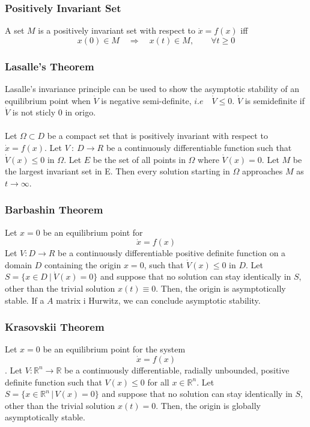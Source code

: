 \documentclass{article}
\begin{document}
\subsubsection{Positively Invariant Set}
A set $M$ is a positively invariant set with respect to $\dot x = f(x)$ iff
\begin{equation*}
	x(0) \in M \quad \Rightarrow \quad x(t) \in M, \qquad \forall t \geq 0
\end{equation*}
\subsubsection{Lasalle's Theorem}
Lasalle's invariance principle can be used to show the asymptotic stability of
an equilibrium point when $\dot V$ is negative semi-definite, $i.e \quad \dot V
	\leq 0$. $\dot V$ is semidefinite if $\dot V$ is not sticly 0 in origo. \\\\
Let $\Omega \subset D$ be a compact set that is positively invariant with
respect to $\dot x = f(x)$. Let $V\::\:D \rightarrow R$ be a continuously
differentiable function such that $\dot V(x) \leq 0$ in $\Omega$. Let $E$ be
the set of all points in $\Omega$ where $\dot V(x) = 0$. Let $M$ be the largest
invariant set in E. Then every solution starting in $\Omega$ approaches $M$ as
$t \rightarrow \infty$.
\begin{figure}[h]
	\centering
	\def\svgwidth{0.5\columnwidth}
	
\end{figure}
\subsubsection{Barbashin Theorem}
Let $x=0$ be an equilibrium point for \[\dot{x} = f(x)\]
Let $V: D \rightarrow R$ be a continuously differentiable positive definite
function on a domain $D$ containing the origin $x=0$, such that $\dot V(x) \leq
0$ in $D$. Let $S=\{x \in D\:|\:\dot V(x) = 0\}$ and suppose that no solution
can stay identically in $S$, other than the trivial solution $x(t) \equiv 0$.
Then, the origin is asymptotically stable. If a $A$ matrix i Hurwitz, we can
conclude asymptotic stability.
\subsubsection{Krasovskii Theorem}
Let \(x = 0\) be an equilibrium point for the system\[\dot{x} = f(x)\]. Let \(V : \mathbb{R}^n \to \mathbb{R}\) be a continuously differentiable, radially unbounded, positive definite function such that \(V(x) \leq 0\) for all \(x \in \mathbb{R}^n\). Let \(S = \{x \in \mathbb{R}^n \,|\, V(x) = 0\}\) and suppose that no solution can stay identically in \(S\), other than the trivial solution \(x(t) = 0\). Then, the origin is globally asymptotically stable.
\end{document}
